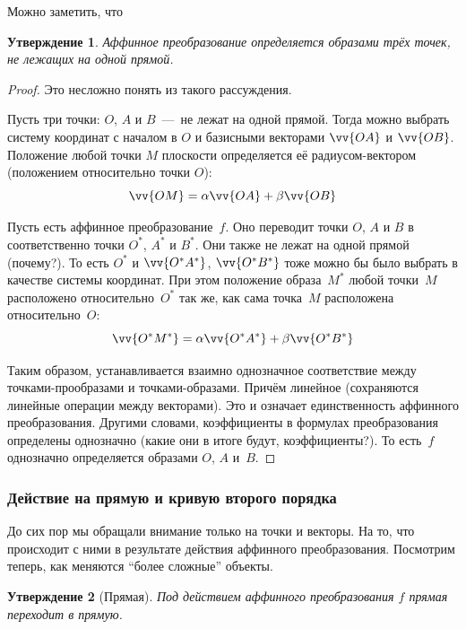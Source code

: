 \documentclass[a4paper,12pt]{article}
\newtheorem{proposition}{Утверждение}[section]
\begin{document}
  Можно заметить, что
  
  \begin{proposition}
    Аффинное преобразование определяется образами трёх точек, не лежащих на одной прямой.
  \end{proposition}
  
  \begin{proof}
    Это несложно понять из такого рассуждения.
    
    Пусть три точки: $O$, $A$ и $B$~---~не лежат на одной прямой.
    Тогда можно выбрать систему координат с началом в $O$ и базисными векторами $\vv{OA}$ и $\vv{OB}$.
    Положение любой точки $M$ плоскости определяется её радиусом-вектором (положением относительно точки $O$):
    \[
      \vv{OM} = \alpha \vv{OA} + \beta \vv{OB}
    \]
    
    Пусть есть аффинное преобразование~$f$.
    Оно переводит точки $O$, $A$ и $B$ в соответственно точки $O^*$, $A^*$ и $B^*$.
    Они также не лежат на одной прямой (почему?).
    То есть $O^*$ и $\vv{O^*A^*}$, $\vv{O^*B^*}$ тоже можно бы было выбрать в качестве системы координат.
    При этом положение образа~$M^*$ любой точки~$M$ расположено относительно~$O^*$ так же, как сама точка~$M$ расположена относительно~$O$:
    \[
      \vv{O^*M^*} = \alpha \vv{O^*A^*} + \beta \vv{O^*B^*}
    \]
    
    Таким образом, устанавливается взаимно однозначное соответствие между точками-прообразами и точками-образами.
    Причём линейное (сохраняются линейные операции между векторами).
    Это и означает единственность аффинного преобразования.
    Другими словами, коэффициенты в формулах преобразования определены однозначно (какие они в итоге будут, коэффициенты?).
    То есть~$f$ однозначно определяется образами $O$, $A$ и~$B$.
  \end{proof}
  
  
  \subsubsection{Действие на прямую и кривую второго порядка}
  
  До сих пор мы обращали внимание только на точки и векторы.
  На то, что происходит с ними в результате действия аффинного преобразования.
  Посмотрим теперь, как меняются ``более сложные'' объекты.
  
  \begin{proposition}[Прямая]
    Под действием аффинного преобразования $f$ прямая переходит в прямую.
  \end{proposition}
  
\end{document}
